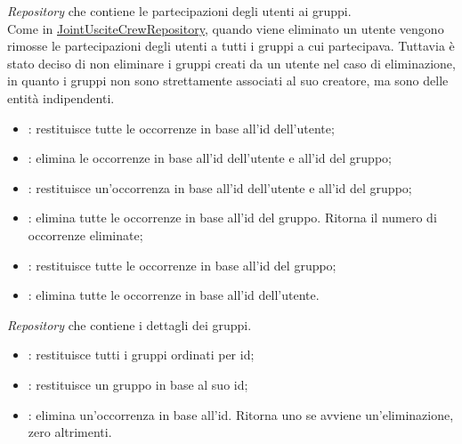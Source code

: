 \label{JointUtentiCrewRepository}
\textit{Repository} che contiene le partecipazioni degli utenti ai gruppi. \\
Come in \hyperref[JointUsciteCrewRepository]{JointUsciteCrewRepository}, quando viene eliminato un utente vengono rimosse le partecipazioni degli utenti a tutti i gruppi a cui partecipava. Tuttavia è stato deciso di non eliminare i gruppi creati da un utente nel caso di eliminazione, in quanto i gruppi non sono strettamente associati al suo creatore, ma sono delle entità indipendenti.
\begin{itemize}
    \item {}: restituisce tutte le occorrenze in base all'id dell'utente;
    \item {}: elimina le occorrenze in base all'id dell'utente e all'id del gruppo;
    \item {}: restituisce un'occorrenza in base all'id dell'utente e all'id del gruppo;
    \item {}: elimina tutte le occorrenze in base all'id del gruppo. Ritorna il numero di occorrenze eliminate;
    \item {}: restituisce tutte le occorrenze in base all'id del gruppo;
    \item {}: elimina tutte le occorrenze in base all'id dell'utente.
    
\end{itemize} 






\label{CrewRepository}
\textit{Repository} che contiene i dettagli dei gruppi. \\
\begin{itemize}
    \item {}: restituisce tutti i gruppi ordinati per id;
    \item {}: restituisce un gruppo in base al suo id;
    \item {}: elimina un'occorrenza in base all'id. Ritorna uno se avviene un'eliminazione, zero altrimenti.
\end{itemize}


